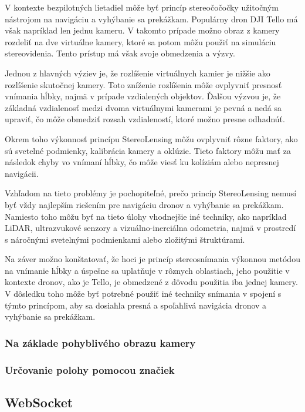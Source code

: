 V kontexte bezpilotných lietadiel môže byť princíp stereočočočky užitočným nástrojom na navigáciu a vyhýbanie sa prekážkam. Populárny dron DJI Tello má však napríklad len jednu kameru. V takomto prípade možno obraz z kamery rozdeliť na dve virtuálne kamery, ktoré sa potom môžu použiť na simuláciu stereovidenia. Tento prístup má však svoje obmedzenia a výzvy.

Jednou z hlavných výziev je, že rozlíšenie virtuálnych kamier je nižšie ako rozlíšenie skutočnej kamery. Toto zníženie rozlíšenia môže ovplyvniť presnosť vnímania hĺbky, najmä v prípade vzdialených objektov. Ďalšou výzvou je, že základná vzdialenosť medzi dvoma virtuálnymi kamerami je pevná a nedá sa upraviť, čo môže obmedziť rozsah vzdialeností, ktoré možno presne odhadnúť.

Okrem toho výkonnosť princípu StereoLensing môžu ovplyvniť rôzne faktory, ako sú svetelné podmienky, kalibrácia kamery a oklúzie. Tieto faktory môžu mať za následok chyby vo vnímaní hĺbky, čo môže viesť ku kolíziám alebo nepresnej navigácii.

Vzhľadom na tieto problémy je pochopiteľné, prečo princíp StereoLensing nemusí byť vždy najlepším riešením pre navigáciu dronov a vyhýbanie sa prekážkam. Namiesto toho môžu byť na tieto úlohy vhodnejšie iné techniky, ako napríklad LiDAR, ultrazvukové senzory a vizuálno-inerciálna odometria, najmä v prostredí s náročnými svetelnými podmienkami alebo zložitými štruktúrami.

Na záver možno konštatovať, že hoci je princíp stereosnímania výkonnou metódou na vnímanie hĺbky a úspešne sa uplatňuje v rôznych oblastiach, jeho použitie v kontexte dronov, ako je Tello, je obmedzené z dôvodu použitia iba jednej kamery. V dôsledku toho môže byť potrebné použiť iné techniky snímania v spojení s týmto princípom, aby sa dosiahla presná a spoľahlivá navigácia dronov a vyhýbanie sa prekážkam.
\subsubsection{Na základe pohyblivého obrazu kamery}

\subsubsection{Určovanie polohy pomocou značiek}

\subsection{WebSocket}






